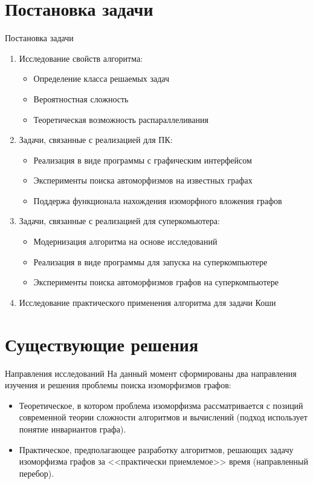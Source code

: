\documentclass{beamer}
\begin{document}
\section{Постановка задачи}
\begin{frame}{Постановка задачи}
\small
\begin{enumerate}
\item Исследование свойств алгоритма:
\begin{itemize}
\scriptsize
\item Определение класса решаемых задач
\item Вероятностная сложность
\item Теоретическая возможность распараллеливания
\end{itemize}
\item Задачи, связанные с реализацией для ПК:
\begin{itemize}
\scriptsize
\item Реализация в виде программы с графическим интерфейсом
\item Эксперименты поиска автоморфизмов на известных графах
\item Поддержа функционала нахождения изоморфного вложения графов
\end{itemize}
\item Задачи, связанные с реализацией для суперкомьютера:
\begin{itemize}
\scriptsize
\item Модернизация алгоритма на основе исследований
\item Реализация в виде программы для запуска на суперкомпьютере
\item Эксперименты поиска автоморфизмов графов на суперкомпьютере
\end{itemize}
\item Исследование практического применения алгоритма для задачи Коши
\end{enumerate}
\end{frame} 


\section{Существующие решения}
\begin{frame}{Направления исследований}
На данный момент сформированы два направления изучения и решения проблемы поиска изоморфизмов графов:
\begin{itemize}
\item Теоретическое, в котором проблема изоморфизма рассматривается с позиций современной теории сложности алгоритмов и вычислений (подход использует понятие инвариантов графа).

\item Практическое, предполагающее разработку алгоритмов, решающих задачу изоморфизма графов за <<практически приемлемое>> время (направленный перебор).
\end{itemize}
\end{frame}
\end{document}
